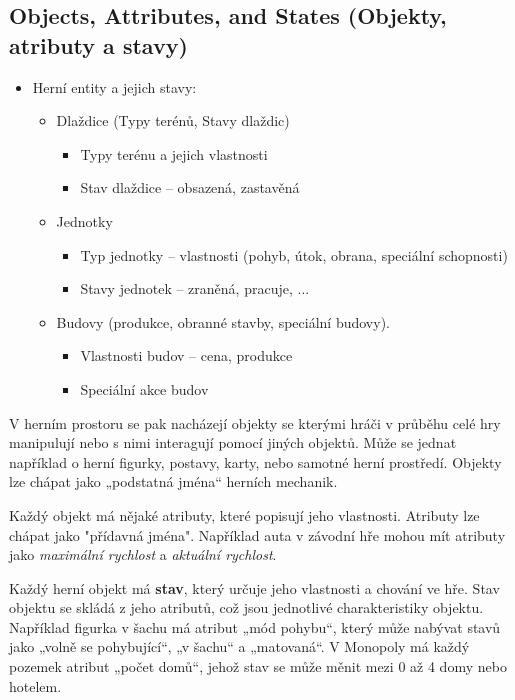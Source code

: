 \subsection{Objects, Attributes, and States (Objekty, atributy a stavy)}
\begin{itemize}
    \item Herní entity a jejich stavy:
    \begin{itemize}
        \item Dlaždice (Typy terénů, Stavy dlaždic)
        \begin{itemize}
            \item Typy terénu a jejich vlastnosti
            \item Stav dlaždice -- obsazená, zastavěná
        \end{itemize}
        \item Jednotky
        \begin{itemize}
            \item Typ jednotky -- vlastnosti (pohyb, útok, obrana, speciální schopnosti)
            \item Stavy jednotek -- zraněná, pracuje, ...
        \end{itemize}
        \item Budovy (produkce, obranné stavby, speciální budovy).
        \begin{itemize}
            \item Vlastnosti budov -- cena, produkce
            \item Speciální akce budov
        \end{itemize}
    \end{itemize}
\end{itemize}

V herním prostoru se pak nacházejí objekty se kterými hráči v průběhu celé hry manipulují nebo s nimi interagují pomocí jiných objektů. Může se jednat například o herní figurky, postavy, karty, nebo samotné herní prostředí. Objekty lze chápat jako „podstatná jména“ herních mechanik. 

Každý objekt má nějaké atributy, které popisují jeho vlastnosti. Atributy lze chápat jako "přídavná jména". Například auta v závodní hře mohou mít atributy jako \textit{maximální rychlost} a \textit{aktuální rychlost}. 

Každý herní objekt má \textbf{stav}, který určuje jeho vlastnosti a chování ve hře. Stav objektu se skládá z jeho atributů, což jsou jednotlivé charakteristiky objektu. Například figurka v šachu má atribut „mód pohybu“, který může nabývat stavů jako „volně se pohybující“, „v šachu“ a „matovaná“. V Monopoly má každý pozemek atribut „počet domů“, jehož stav se může měnit mezi 0 až 4 domy nebo hotelem.

